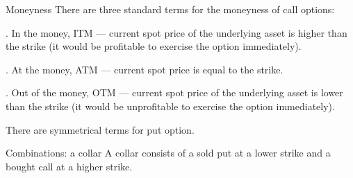 \documentclass{beamer}
\begin{document}
\begin{frame}{Moneyness}
\justify
There are three standard terms for the \alert{moneyness} of call options:

. In the money, ITM --- current spot price of the underlying asset is higher than the strike (it would be profitable to exercise the option immediately).

. At the money, ATM --- current spot price is equal to the strike.

. Out of the money, OTM --- current spot price of the underlying asset is lower than the strike (it would be unprofitable to exercise the option immediately).

\justify
There are symmetrical terms for put option.
\end{frame}



\begin{frame}{Combinations: a collar}
\justifying
A \alert{collar} consists of a sold put at a lower strike and a bought call at a higher strike.

\justifying
\centering
\end{frame}
\end{document}
